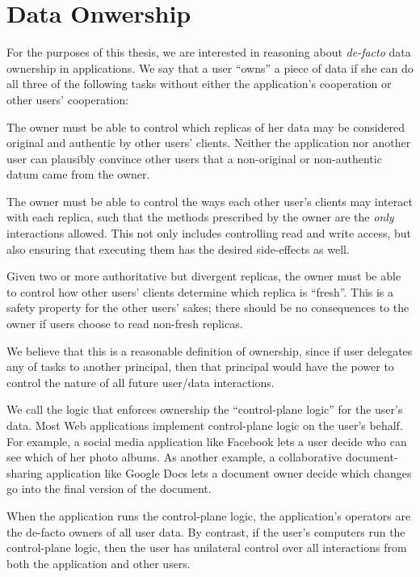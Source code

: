 \section{Data Onwership}

For the purposes of this thesis, we are interested in reasoning about \emph{de-facto}
data ownership in applications.  We say that a user
``owns'' a piece of data if she can do all three of the following tasks without
either the application's cooperation or other users' cooperation:

  The owner must be able to
control which replicas of her data may be considered original and authentic 
by other users' clients.  Neither the application nor another user can plausibly
convince other users that a non-original or non-authentic datum came from the
owner.

  The owner must be able to control
the ways each other user's clients may interact with each replica, such that the methods
prescribed by the owner are the \emph{only} interactions allowed.
This not only includes controlling read and write access, but also ensuring that
executing them has the desired side-effects as well.

  Given two or more authoritative but divergent replicas,
the owner must be able to control how other users' clients determine which
replica is ``fresh''.  This is a safety property for the other users' sakes;
there should be no consequences to the owner if users choose to read non-fresh
replicas.

We believe that this is a reasonable definition of ownership,
since if user delegates any of tasks to
another principal, then that principal would
have the power to control the nature of all future user/data interactions.

We call the logic that enforces ownership the ``control-plane logic'' for the
user's data.  Most Web applications implement
control-plane logic on the user's behalf.  For example, a social media
application like Facebook lets a user decide who can see which of her photo albums.  As
another example, a collaborative document-sharing application like Google Docs
lets a document owner decide which changes go into the final version of the document.

When the application runs the control-plane logic, the application's
operators are the de-facto owners of all user data.  By contrast, if the user's
computers run the control-plane logic, then the user has
unilateral control over all interactions from both the application
and other users.

